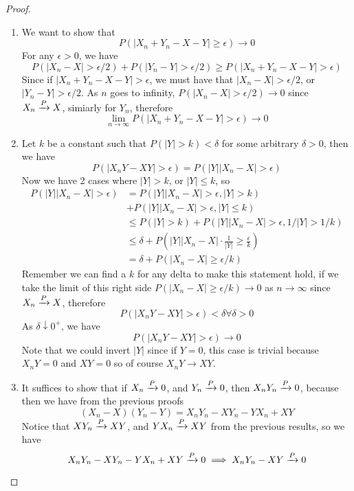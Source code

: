 \documentclass[openany]{report}
\begin{document}
\begin{proof}
    \begin{enumerate}[label=(\roman*)]
        \item We want to show that 
        \[P(|X_n + Y_n - X - Y| \geq \epsilon) \rightarrow 0\]
        For any $\epsilon > 0$, we have 
        \[P(|X_n - X| > \epsilon/2) + P(|Y_n - Y| > \epsilon/2) \geq P(|X_n + Y_n - X - Y| > \epsilon)\]
        Since if $|X_n + Y_n - X - Y| > \epsilon$, we must have that $|X_n - X| > \epsilon/2$, or $|Y_n - Y| > \epsilon/2$.  As $n$ goes to infinity, $P(|X_n - X| > \epsilon/2) \rightarrow 0$ since $X_n \xrightarrow{P} X$, simiarly for $Y_n$, therefore 
        \[\lim_{n\rightarrow\infty}P(|X_n+Y_n- X - Y| > \epsilon) \rightarrow 0\]
        \item Let $k$ be a constant such that $P(|Y| > k) < \delta$ for some arbitrary $\delta > 0$, then we have
        \[P(|X_nY - XY| > \epsilon) = P(|Y||X_n - X| > \epsilon)\]
        Now we have 2 cases where $|Y| > k$, or $|Y| \leq k$, so
        \begin{align*}
            P(|Y||X_n - X| > \epsilon) &= P(|Y||X_n-X| > \epsilon, |Y| > k)\\
            &+ P(|Y||X_n-X| > \epsilon, |Y| \leq k)\\
            &\leq P(|Y| > k) +  P(|Y||X_n-X| > \epsilon, 1/|Y| > 1/k)\\
            &\leq \delta + P\left(|Y||X_n-X|\cdot \frac{1}{|Y|} \geq \frac{\epsilon}{k}\right)\\
            &= \delta + P(|X_n-X| \geq \epsilon/k)
        \end{align*}
        Remember we can find a $k$ for any delta to make this statement hold, if we take the limit of this right side $P(|X_n-X| \geq \epsilon/k) \rightarrow 0$ as $n\rightarrow \infty$ since $X_n \xrightarrow{P} X$, therefore 
        \[P(|X_nY - XY| > \epsilon) < \delta \forall \delta > 0\]
        As $\delta \downarrow 0^+$, we have 
        \[P(|X_nY - XY| > \epsilon) \rightarrow 0\]
        Note that we could invert $|Y|$ since if $Y = 0$, this case is trivial because $X_nY = 0$ and $XY = 0$ so of course $X_nY \rightarrow XY$.
        \item It suffices to show that if $X_n \xrightarrow{P} 0$, and $Y_n \xrightarrow{P} 0$, then $X_nY_n \xrightarrow{P} 0$, because then we have from the previous proofs
        \[(X_n-X)(Y_n-Y) = X_nY_n - XY_n - YX_n + XY \]
        Notice that $XY_n \xrightarrow{P} XY$, and $YX_n \xrightarrow{P} XY$ from the previous results, so we have
        \[X_nY_n - XY_n - YX_n + XY \xrightarrow{P} 0 \implies X_nY_n - XY \xrightarrow{P} 0\]

\end{enumerate}
\end{proof}
\end{document}
